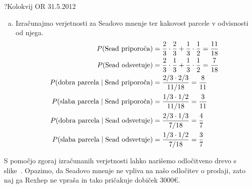 \begin{naloga}{?}{Kolokvij OR 31.5.2012}
\begin{odgovor}
\begin{enumerate}[(a)]
\item Izračunajmo verjetnosti za Seadovo mnenje
ter kakovost parcele v odvisnosti od njega.
\begin{align*}
P(\text{Sead priporoča}) &=
{2 \over 3} \cdot {2 \over 3} + {1 \over 3} \cdot {1 \over 2}
= {11 \over 18} \\
P(\text{Sead odsvetuje}) &=
{2 \over 3} \cdot {1 \over 3} + {1 \over 3} \cdot {1 \over 2}
= {7 \over 18} \\
P(\text{dobra parcela} \;|\; \text{Sead priporoča})
&= {2/3 \cdot 2/3 \over 11/18} = {8 \over 11} \\
P(\text{slaba parcela} \;|\; \text{Sead priporoča})
&= {1/3 \cdot 1/2 \over 11/18} = {3 \over 11} \\
P(\text{dobra parcela} \;|\; \text{Sead odsvetuje})
&= {2/3 \cdot 1/3 \over 7/18} = {4 \over 7} \\
P(\text{slaba parcela} \;|\; \text{Sead odsvetuje})
&= {1/3 \cdot 1/2 \over 7/18} = {3 \over 7}
\end{align*}
\end{enumerate}
S pomočjo zgoraj izračunanih verjetnosti
lahko narišemo odločitveno drevo s slike~\fig.
Opazimo, da Seadovo mnenje ne vpliva na našo odločitev o prodaji,
zato naj ga Rexhep ne vpraša in tako pričakuje dobiček $3000 €$.

\begin{slika}
\makebox[\textwidth][c]{
\pgfslika
}
\end{slika}
\end{odgovor}
\end{naloga}
